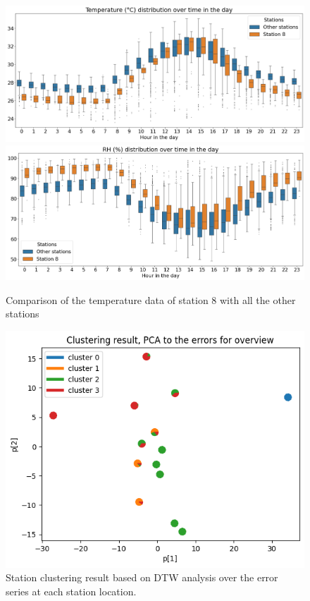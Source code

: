 \documentclass[a4paper,fleqn]{cas-sc}
\begin{document}
\begin{figure}[!h]
	\centering
        \includegraphics[scale=0.25]{figs/new_figs/station8tem.png}
        \includegraphics[scale=0.25]{figs/new_figs/station8RH.png}
	\caption{Comparison of the temperature data of station 8 with all the other stations}
	\label{FIG:station8tem}
\end{figure}


\begin{figure}
	\centering
	\includegraphics[scale=0.6]{figs/new_figs/clusteringresult.png}
	\caption{Station clustering result based on DTW analysis over the error series at each station location.}
	\label{FIG:Result of DTW clustering}
\end{figure}
\end{document}
